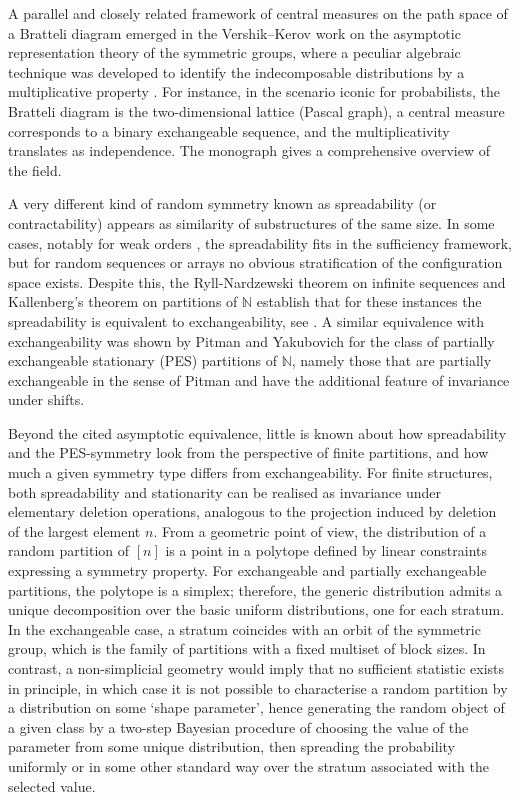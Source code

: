 \documentclass{article}
\begin{document}
A parallel and closely related framework of central measures on the path space of a Bratteli diagram emerged in the Vershik--Kerov work on the asymptotic representation theory of the symmetric groups, where a peculiar algebraic technique was developed to identify the indecomposable distributions by a multiplicative property \cite{VK}. For instance, in the scenario iconic for probabilists, the Bratteli diagram is the two-dimensional lattice (Pascal graph), a central measure corresponds to a binary exchangeable sequence, and the multiplicativity translates as independence. The monograph \cite{BO} gives a comprehensive overview of the field.



A very different kind of random symmetry known as spreadability (or contractability) appears as similarity of substructures of the same size. 
In some cases, notably for weak orders \cite{GO, Jacka}, the spreadability fits in the sufficiency framework, but for random sequences or arrays no obvious stratification of the configuration space exists.
Despite this, the Ryll-Nardzewski theorem on infinite sequences and Kallenberg's theorem on partitions of ${\mathbb N}$ establish that for these instances the spreadability is equivalent to exchangeability, see \cite{Kallenberg}.
A similar equivalence with exchangeability was shown by Pitman and Yakubovich \cite{PY} for the class of partially exchangeable stationary (PES) partitions of $\mathbb N$, namely those that are partially exchangeable in the sense of Pitman \cite{PitmanPTRF} and have the additional feature of invariance under shifts.


Beyond the cited asymptotic equivalence, little is known about how spreadability and the PES-symmetry look from the perspective of finite partitions, and how much a given symmetry type differs from exchangeability. For finite structures, both spreadability and stationarity can be realised as invariance under elementary deletion operations, analogous to the projection induced by deletion of the largest element $n$. From a geometric point of view, the distribution of a random partition of $[n]$ is a point in a polytope defined by linear constraints expressing a symmetry property. 
For exchangeable and partially exchangeable partitions, the polytope is a simplex; therefore, the generic distribution admits a unique decomposition over the basic uniform distributions, one for each stratum. In the exchangeable case, a stratum coincides with an orbit of the symmetric group, which is the family of partitions with a fixed multiset of block sizes. In contrast, a non-simplicial geometry would imply that no sufficient statistic exists in principle, in which case it is not possible to characterise a random partition by a distribution on some `shape parameter', hence generating the random object of a given class by a two-step Bayesian procedure of choosing the value of the parameter from some unique distribution, then spreading the probability uniformly or in some other standard way over the stratum associated with the selected value.
\end{document}

